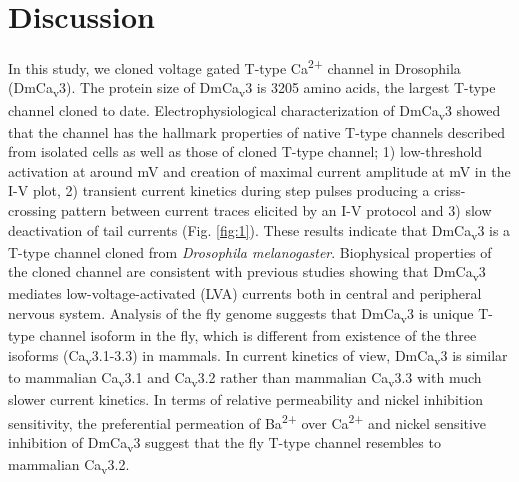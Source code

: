 \section*{Discussion}

In this study, we cloned voltage gated T-type Ca\textsuperscript{2+} channel in Drosophila (DmCa\textsubscript{v}3). The protein size of DmCa\textsubscript{v}3 is 3205 amino acids, the largest T-type channel cloned to date\cite{20056611}. Electrophysiological characterization of DmCa\textsubscript{v}3 showed that the channel has the hallmark properties of native T-type channels described from isolated cells as well as those of cloned T-type channel; 1) low-threshold activation at around  mV and creation of maximal current amplitude at  mV in the I-V plot, 2) transient current kinetics during step pulses producing a criss-crossing pattern between current traces elicited by an I-V protocol and 3) slow deactivation of tail currents (Fig. \ref{fig:1}). These results indicate that DmCa\textsubscript{v}3 is a T-type channel cloned from \emph{Drosophila melanogaster}. Biophysical properties of the cloned channel are consistent with previous studies showing that DmCa\textsubscript{v}3 mediates low-voltage-activated (LVA) currents both in central and peripheral nervous system\cite{22183725, 23864373}. Analysis of the fly genome suggests that DmCa\textsubscript{v}3 is unique T-type channel isoform in the fly, which is different from existence of the three isoforms (Ca\textsubscript{v}3.1-3.3) in mammals. In current kinetics of view, DmCa\textsubscript{v}3 is similar to mammalian Ca\textsubscript{v}3.1 and Ca\textsubscript{v}3.2 rather than mammalian Ca\textsubscript{v}3.3 with much slower current kinetics. In terms of relative permeability and nickel inhibition sensitivity, the preferential permeation of Ba\textsuperscript{2+} over Ca\textsuperscript{2+} and nickel sensitive inhibition of DmCa\textsubscript{v}3 suggest that the fly T-type channel resembles to mammalian Ca\textsubscript{v}3.2\cite{16377633, 23849427}.

